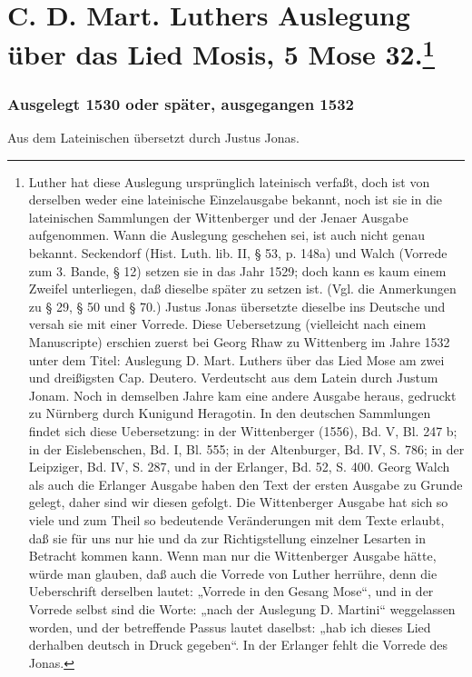 \chapter[C. D. Mart. Luthers Auslegung über das Lied Mosis,]{C. D. Mart. Luthers Auslegung über das Lied Mosis, 5 Mose 32.\footnote{Luther hat diese Auslegung ursprünglich lateinisch verfaßt, doch ist von derselben weder eine lateinische Einzelausgabe bekannt, noch ist sie in die lateinischen Sammlungen der Wittenberger und der Jenaer Ausgabe aufgenommen. Wann die Auslegung geschehen sei, ist auch nicht genau bekannt. Seckendorf (Hist. Luth. lib. II, § 53, p. 148a) und Walch (Vorrede zum 3. Bande, § 12) setzen sie in das Jahr 1529; doch kann es kaum einem Zweifel unterliegen, daß dieselbe später zu setzen ist. (Vgl. die Anmerkungen zu § 29, § 50 und § 70.) Justus Jonas übersetzte dieselbe ins Deutsche und versah sie mit einer Vorrede. Diese Uebersetzung (vielleicht nach einem Manuscripte) erschien zuerst bei Georg Rhaw zu Wittenberg im Jahre 1532 unter dem Titel: Auslegung D. Mart. Luthers über das Lied Mose am zwei und dreißigsten Cap. Deutero. Verdeutscht aus dem Latein durch Justum Jonam. Noch in demselben Jahre kam eine andere Ausgabe heraus, gedruckt zu Nürnberg durch Kunigund Heragotin. In den deutschen Sammlungen findet sich diese Uebersetzung: in der Wittenberger (1556), Bd. V, Bl. 247 b; in der Eislebenschen, Bd. I, Bl. 555; in der Altenburger, Bd. IV, S. 786; in der Leipziger, Bd. IV, S. 287, und in der Erlanger, Bd. 52, S. 400. Georg Walch als auch die Erlanger Ausgabe haben den Text der ersten Ausgabe zu Grunde gelegt, daher sind wir diesen gefolgt. Die Wittenberger Ausgabe hat sich so viele und zum Theil so bedeutende Veränderungen mit dem Texte erlaubt, daß sie für uns nur hie und da zur Richtigstellung einzelner Lesarten in Betracht kommen kann. Wenn man nur die Wittenberger Ausgabe hätte, würde man glauben, daß auch die Vorrede von Luther herrühre, denn die Ueberschrift derselben lautet: „Vorrede in den Gesang Mose“, und in der Vorrede selbst sind die Worte: „nach der Auslegung D. Martini“ weggelassen worden, und der betreffende Passus lautet daselbst: „hab ich dieses Lied derhalben deutsch in Druck gegeben“. In der Erlanger fehlt die Vorrede des Jonas.}}

\subsection{Ausgelegt 1530 oder später, ausgegangen 1532}

Aus dem Lateinischen übersetzt durch Justus Jonas.

